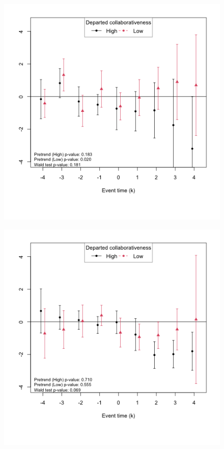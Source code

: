 \begin{figure}[htbp]
\begin{minipage}[b]{0.49\textwidth}
    \end{minipage}
    \begin{minipage}[b]{0.49\textwidth}
        \centering
            \label{fig:prs_opened_more_involved}
        \includegraphics[width=\textwidth]{temp/output/collab_imp/inv0_cs_norm_prs_opened.png}
    \end{minipage}
    \begin{minipage}[b]{0.49\textwidth}
        \centering
            \label{fig:prs_opened_less_involved}
        \includegraphics[width=\textwidth]{temp/output/collab_imp/inv1_cs_norm_prs_opened.png}
    \end{minipage}


\end{figure}
